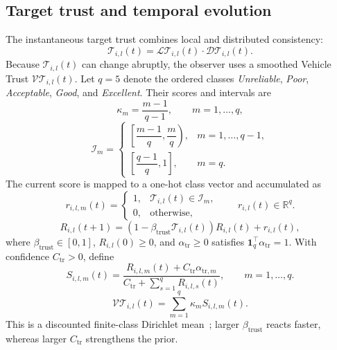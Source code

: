 \documentclass[letterpaper,journal]{IEEEtran}
\def\LT{\mathcal{LT}} %
\def\DT{\mathcal{DT}} %
\def\VT{\mathcal{VT}} %
\def\T{\mathcal{T}} %
\begin{document}
\subsection{Target trust and temporal evolution}\label{subsec_evolution}
The instantaneous target trust combines local and distributed consistency:
\begin{equation}
    \T_{i,l}(t) =  \LT_{i,l}(t) \cdot \DT_{i,l}(t).
    \label{trs_sample_genral}
\end{equation}
Because $\T_{i,l}(t)$ can change abruptly, the observer uses a smoothed Vehicle Trust $\VT_{i,l}(t)$. Let $q=5$ denote the ordered classes \textit{Unreliable}, \textit{Poor}, \textit{Acceptable}, \textit{Good}, and \textit{Excellent}. Their scores and intervals are
\begin{equation}
    \kappa_m=\frac{m-1}{q-1}, \qquad m=1,\ldots,q,
\end{equation}
\begin{equation}
    \mathcal{I}_m =
    \begin{cases}
    \left[\dfrac{m-1}{q},\dfrac{m}{q}\right), & m=1,\ldots,q-1,\\[1ex]
    \left[\dfrac{q-1}{q},1\right], & m=q.
    \end{cases}
\end{equation}
The current score is mapped to a one-hot class vector and accumulated as
\begin{equation}
    r_{i,l,m}(t)=
    \begin{cases}
    1, & \T_{i,l}(t)\in \mathcal{I}_m,\\
    0, & \text{otherwise,}
    \end{cases}
    \qquad
    r_{i,l}(t)\in\mathbb{R}^{q}.
\end{equation}
\begin{equation}
    R_{i,l}(t+1)=
    \left(1-\beta_{\text{trust}}\T_{i,l}(t)\right)R_{i,l}(t)
    +r_{i,l}(t),
    \label{eq_class_history_update}
\end{equation}
where $\beta_{\text{trust}}\in[0,1]$, $R_{i,l}(0)\ge0$, and $\alpha_{\mathrm{tr}}\ge0$ satisfies $\mathbf1_q^\top\alpha_{\mathrm{tr}}=1$. With confidence $C_{\mathrm{tr}}>0$, define
\begin{equation}
    S_{i,l,m}(t)=
    \frac{R_{i,l,m}(t)+C_{\mathrm{tr}}\alpha_{\mathrm{tr},m}}
    {C_{\mathrm{tr}}+\sum_{s=1}^{q}R_{i,l,s}(t)},
    \qquad m=1,\ldots,q.
    \label{eq_class_distribution}
\end{equation}
\begin{equation}
    \VT_{i,l}(t)=
    \sum_{m=1}^{q}\kappa_m S_{i,l,m}(t).
    \label{eq_class_filtered_vehicle_trust}
\end{equation}
This is a discounted finite-class Dirichlet mean~\cite{josang2007dirichlet}; larger $\beta_{\text{trust}}$ reacts faster, whereas larger $C_{\mathrm{tr}}$ strengthens the prior.
\end{document}
